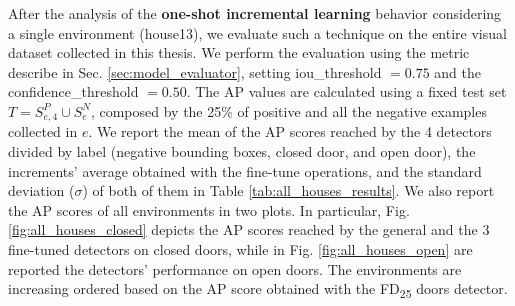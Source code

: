 After the analysis of the \textbf{one-shot incremental learning} behavior considering a single environment (\textsf{house13}), we evaluate such a technique on the entire visual dataset collected in this thesis. We perform the  evaluation using the metric describe in Sec. \ref{sec:model_evaluator}, setting \textsf{iou\_threshold} $= 0.75$ and the \textsf{confidence\_threshold} $= 0.50$. The AP values are calculated using a fixed test set $T = S^{P}_{e, 4} \cup S^{N}_{e}$, composed by the 25\% of positive and all the negative examples collected in $e$.  We report the mean of the AP scores reached by the 4 detectors divided by label (negative bounding boxes, closed door, and open door), the increments' average obtained with the fine-tune operations, and the standard deviation ($\sigma$) of both of them in Table \ref{tab:all_houses_results}. We also report the AP scores of all environments in two plots. In particular, Fig. \ref{fig:all_houses_closed} depicts the AP scores reached by the general and the 3 fine-tuned detectors on closed doors, while in Fig. \ref{fig:all_houses_open} are reported the detectors' performance on open doors. The environments are increasing ordered based on the AP score obtained with the \textsf{FD\textsubscript{25}} doors detector.


